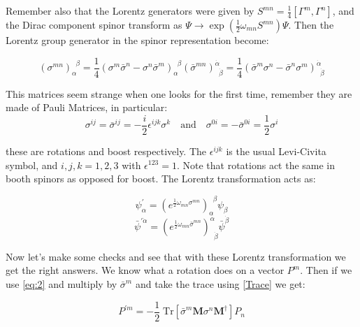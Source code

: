 Remember also that the Lorentz generators were given by $S^{mn} = \frac{1}{4}[ \Gamma^{m}, \Gamma^{n}]$, and the Dirac component spinor transform as $\Psi \rightarrow \exp(\frac{1}{2}\omega_{mn}S^{mn})\Psi$. Then the Lorentz group generator in the spinor representation become:

\begin{subequations}
\begin{equation}
(\sigma^{mn})^{\;\;\beta}_{\alpha} =\frac{1}{4} (\sigma^{m}\bar{\sigma}^{n} - \sigma^{n}\bar{\sigma}^{m})^{\;\;\beta}_{\alpha}
\end{equation}
\begin{equation}
(\bar{\sigma}^{mn})^{\dot{\alpha}}_{\;\;\dot{\beta}} = \frac{1}{4}(\bar{\sigma}^{m}\sigma^{n} - \bar{\sigma}^{n}\sigma^{m})^{\dot{\alpha}}_{\;\;\dot{\beta}}
\end{equation}
\end{subequations}


This matrices seem strange when one looks for the first time, remember they are made of Pauli Matrices, in particular:
\begin{equation*}
\sigma^{ij} = \bar{\sigma}^{ij} = -\frac{i}{2}\epsilon^{ijk}\sigma^{k} \quad \text{and} \quad
\sigma^{0i} = -\bar{\sigma}^{0i} =\frac{1}{2}\sigma^{i}
\end{equation*}

these are rotations and boost respectively. The $\epsilon^{ijk}$ is the usual Levi-Civita symbol, and $i,j,k = 1,2,3$ with $\epsilon^{123} = 1$.  Note that rotations act the same in booth spinors as opposed for boost. The Lorentz transformation acts as:


\begin{equation}
\psi^{'}_{\alpha} = (e^{\frac{1}{2}\omega_{mn}\sigma^{mn}})_{\alpha}^{\;\;\beta} \psi_{\beta}
\label{eq:4}
\end{equation}
\begin{equation}
\bar{\psi}^{'\dot{\alpha}} = (e^{\frac{1}{2}\omega_{mn}\bar{\sigma}^{mn}})_{\;\;\dot{\beta}}^{\dot{\alpha}}\bar{\psi}^{\dot{\beta}} 
\end{equation}



Now let's make some checks and see that with these Lorentz transformation we get the right answers. We know what a rotation does on a vector $P^{m}$. Then if we use \eqref{eq:2} and multiply by $\bar{\sigma}^{m}$ and take the trace using \eqref{Trace} we get:


\begin{equation}
P^{'m} = -\frac{1}{2} \; \text{Tr} [\bar{\sigma}^{m}\mathbf{M}\sigma^{n}\mathbf{M^{\dagger}}]P_{n}
\label{eq5}
\end{equation}

